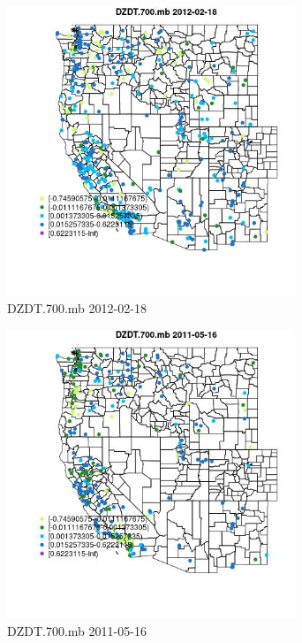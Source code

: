 \begin{figure} 
\centering  
\includegraphics[width=0.77\textwidth]{Code_Outputs/Report_ML_input_PM25_Step4_part_f_de_duplicated_aves_prioritize_24hr_obswNAs_MapObsDZDT700mb2012-02-18.jpg} 
\caption{\label{fig:Report_ML_input_PM25_Step4_part_f_de_duplicated_aves_prioritize_24hr_obswNAsMapObsDZDT700mb2012-02-18}DZDT.700.mb 2012-02-18} 
\end{figure} 
 

\begin{figure} 
\centering  
\includegraphics[width=0.77\textwidth]{Code_Outputs/Report_ML_input_PM25_Step4_part_f_de_duplicated_aves_prioritize_24hr_obswNAs_MapObsDZDT700mb2011-05-16.jpg} 
\caption{\label{fig:Report_ML_input_PM25_Step4_part_f_de_duplicated_aves_prioritize_24hr_obswNAsMapObsDZDT700mb2011-05-16}DZDT.700.mb 2011-05-16} 
\end{figure} 
 

